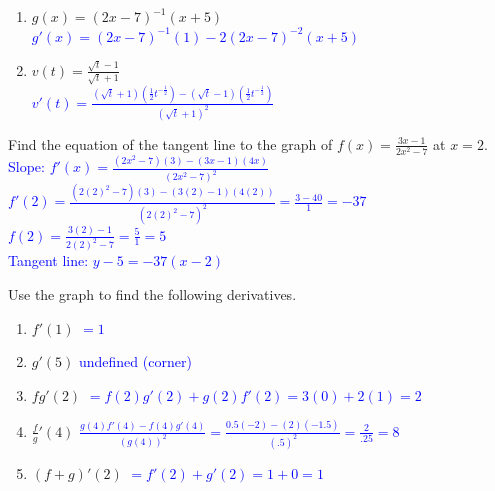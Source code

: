 \documentclass{ximera}
\begin{document}
\begin{exercise}
\begin{enumerate}
        \item $g(x)=(2x-7)^{-1}(x+5)$\\
        \textcolor{blue}{ $g'(x)=(2x-7)^{-1}(1)-2(2x-7)^{-2}(x+5)$}

        \item $v(t)=\frac{\sqrt{t}-1}{\sqrt{t}+1}$\\
        \textcolor{blue}{ $v'(t)=\frac{(\sqrt{t}+1)(\frac{1}{2}t^{-\frac12})-(\sqrt{t}-1)(\frac12t^{-\frac12})}{(\sqrt{t}+1)^2}$}

        
    \end{enumerate}


\end{exercise}

\begin{exercise}
    Find the equation of the tangent line to the graph of $f(x)=\frac{3x-1}{2x^2-7}$ at $x=2$.\\
    \textcolor{blue}{Slope: $f'(x)=\frac{(2x^2-7)(3)-(3x-1)(4x)}{(2x^2-7)^2}$\\
    $f'(2)=\frac{(2(2)^2-7)(3)-(3(2)-1)(4(2))}{(2(2)^2-7)^2}=\frac{3-40}{1}=-37$\\
    $f(2)=\frac{3(2)-1}{2(2)^2-7}=\frac{5}{1}=5$\\
    Tangent line: $y-5=-37(x-2)$}
\end{exercise}



\begin{exercise}
    Use the graph to find the following derivatives.
    \begin{image}
\end{image}
    \begin{enumerate}
        \item $f'(1)$ \textcolor{blue}{$=1$}
       \item $g'(5)$ \textcolor{blue}{undefined (corner)}
        \item $fg'(2)$ \textcolor{blue}{$=f(2)g'(2)+g(2)f'(2)=3(0)+2(1)=2$}
        \item $\frac{f}{g}'(4)$ \textcolor{blue}{$\frac{g(4)f'(4)-f(4)g'(4)}{(g(4))^2}=\frac{0.5(-2)-(2)(-1.5)}{(.5)^2}=\frac{2}{.25}=8$}
        \item $(f+g)'(2)$ \textcolor{blue}{$=f'(2)+g'(2)=1+0=1$}
    \end{enumerate}
\end{exercise}
\end{document}
